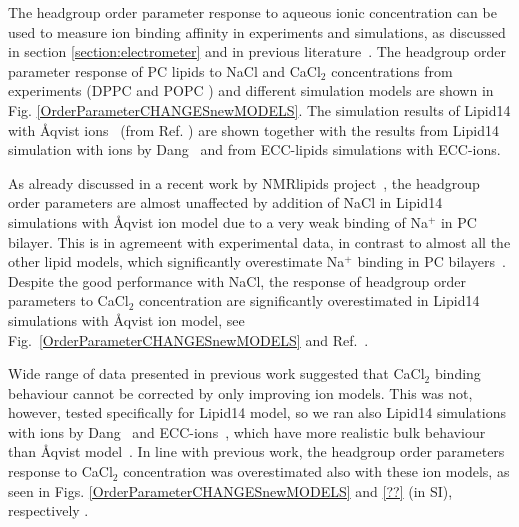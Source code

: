 \documentclass[aip,jcp,twocolumn]{revtex4}
\begin{document}
The headgroup order parameter response to aqueous ionic concentration
can be used to measure ion binding affinity in experiments and simulations,
as discussed in section \ref{section:electrometer} and in previous literature~\cite{seelig87,catte16}.
The headgroup order parameter response of PC lipids to NaCl and CaCl$_2$ concentrations
from experiments (DPPC \cite{akutsu81} and POPC \cite{altenbach84}) and different simulation
models are shown in Fig. \ref{OrderParameterCHANGESnewMODELS}.
The simulation results of Lipid14 with \AA{}qvist ions~\cite{aqvist90} (from Ref. )
are shown together with the results from Lipid14 simulation
with ions by Dang~\cite{smith94,chang1999,dang2006} and from ECC-lipids simulations with ECC-ions.

As already discussed in a recent work by NMRlipids project~\cite{catte16},
the headgroup order parameters are almost unaffected by addition of NaCl
in Lipid14 simulations with \AA{}qvist ion model due to a very weak binding of Na$^+$
in PC bilayer. This is in agremeent with experimental data, in contrast
to almost all the other lipid models, which significantly overestimate
Na$^+$ binding in PC bilayers~\cite{catte16}. Despite the good performance
with NaCl, the response of headgroup order parameters to CaCl$_2$ concentration are
significantly overestimated in Lipid14 simulations with \AA{}qvist ion model,
see Fig.~\ref{OrderParameterCHANGESnewMODELS} and Ref.~.

Wide range of data presented in previous work \cite{catte16} suggested
that CaCl$_2$ binding behaviour cannot be corrected by only improving
ion models. This was not, however, tested specifically for Lipid14 model, so we
ran also Lipid14 simulations with ions by Dang~\cite{smith94,chang1999,dang2006} 
and ECC-ions~\cite{jungwirth17-new-paper-to-be-published, kohagen16, Pluharova2014},
which have more realistic bulk behaviour than \AA{}qvist model~\cite{aqvist90}.
In line with previous work, the headgroup order parameters response
to CaCl$_2$ concentration was overestimated also with these ion models,
as seen in Figs. \ref{OrderParameterCHANGESnewMODELS} and \ref{??} (in SI), respectively
.
\end{document}
